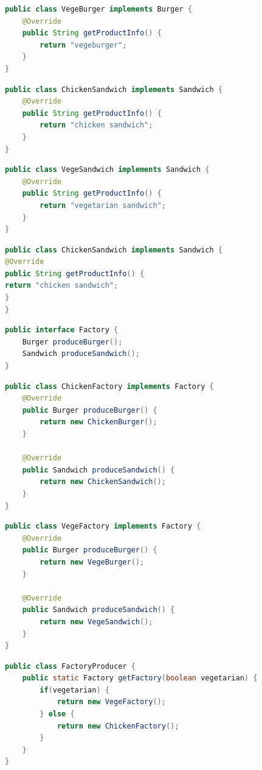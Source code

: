 \begin{lstlisting}[language=Java, title=VegeBurger.java]
public class VegeBurger implements Burger {
    @Override
    public String getProductInfo() {
        return "vegeburger";
    }
}
\end{lstlisting}

\begin{lstlisting}[language=Java, title=ChickenSandwich.java]
public class ChickenSandwich implements Sandwich {
    @Override
    public String getProductInfo() {
        return "chicken sandwich";
    }
}
\end{lstlisting}

\begin{lstlisting}[language=Java, title=VegeSandwich.java]
public class VegeSandwich implements Sandwich {
    @Override
    public String getProductInfo() {
        return "vegetarian sandwich";
    }
}
\end{lstlisting}

\begin{lstlisting}[language=Java, title=ChickenSandwich.java]
public class ChickenSandwich implements Sandwich {
@Override
public String getProductInfo() {
return "chicken sandwich";
}
}
\end{lstlisting}

\begin{lstlisting}[language=Java, title=Factory.java]
public interface Factory {
    Burger produceBurger();
    Sandwich produceSandwich();
}
\end{lstlisting}

\begin{lstlisting}[language=Java, title=ChickenFactory.java]
public class ChickenFactory implements Factory {
    @Override
    public Burger produceBurger() {
        return new ChickenBurger();
    }

    @Override
    public Sandwich produceSandwich() {
        return new ChickenSandwich();
    }
}
\end{lstlisting}

\begin{lstlisting}[language=Java, title=VegeFactory.java]
public class VegeFactory implements Factory {
    @Override
    public Burger produceBurger() {
        return new VegeBurger();
    }

    @Override
    public Sandwich produceSandwich() {
        return new VegeSandwich();
    }
}
\end{lstlisting}

\begin{lstlisting}[language=Java, title=FactoryProducer.java]
public class FactoryProducer {
    public static Factory getFactory(boolean vegetarian) {
        if(vegetarian) {
            return new VegeFactory();
        } else {
            return new ChickenFactory();
        }
    }
}
\end{lstlisting}

